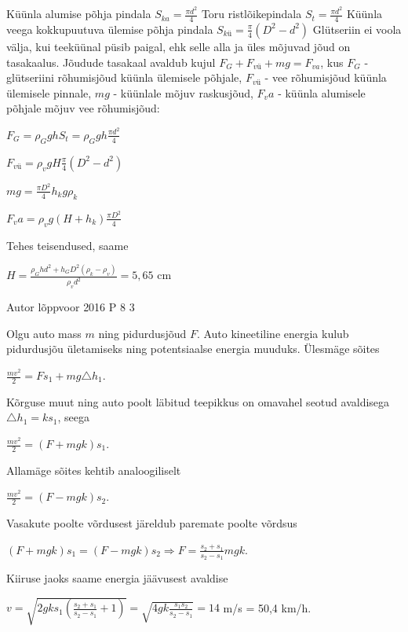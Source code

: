 \documentclass[11pt]{article}
\begin{document}
{{\ifSolution
Küünla alumise põhja pindala $S_{ka} = \frac{\pi d^2}{4}$
\newline
Toru ristlõikepindala $S_t = \frac{\pi d^2}{4}$
\newline
Küünla veega kokkupuutuva ülemise põhja pindala $S_{kü} = \frac{\pi}{4}(D^2 - d^2)$
\newline
Glütseriin ei voola välja, kui teeküünal püsib paigal, ehk selle alla ja üles mõjuvad jõud on tasakaalus. Jõudude tasakaal avaldub kujul $F_G + F_{vü} + mg = F_{va}$,
\newline
kus $F_G$ - glütseriini rõhumisjõud küünla ülemisele põhjale,
\newline
$F_{vü}$ - vee rõhumisjõud küünla ülemisele pinnale,
\newline
$mg$ - küünlale mõjuv raskusjõud,
\newline
$F_va$ - küünla alumisele põhjale mõjuv vee rõhumisjõud:
\begin{center}
$F_G = \rho_G g h S_t = \rho_G g h \frac{\pi d^2}{4}$
\end{center}
\begin{center}
$F_{vü} = \rho_v g H \frac{\pi}{4}(D^2 - d^2)$
\end{center}
\begin{center}
$mg = \frac{\pi D^2}{4}h_k g \rho_k$
\end{center}
\begin{center}
$F_va = \rho_v g (H + h_k)\frac{\pi D^2}{4}$
\end{center}
Tehes teisendused, saame 
\begin{center}
$H = \frac{\rho_{G} h d^2 + h_G D^2 (\rho_k - \rho_v)}{\rho_v d^2} = 5,65$ cm
\end{center}
\fi
}

{Autor} %
{lõppvoor} %
{2016} %
{P 8} %
{3} %
{

\ifSolution
Olgu auto mass $m$ ning pidurdusjõud $F$. Auto kineetiline energia kulub pidurdusjõu ületamiseks ning potentsiaalse energia muuduks. Ülesmäge sõites
\begin{center}
$\frac{mv^2}{2} = Fs_1 + mg\triangle h_1$.
\end{center}
Kõrguse muut ning auto poolt läbitud teepikkus on omavahel seotud avaldisega $\triangle h_1 = ks_1$, seega
\begin{center}
$\frac{mv^2}{2} = (F + mgk)s_1$.
\end{center}
Allamäge sõites kehtib analoogiliselt
\begin{center}
$\frac{mv^2}{2} = (F - mgk) s_2$.
\end{center}
Vasakute poolte võrdusest järeldub paremate poolte võrdsus
\begin{center}
$(F + mgk)s_1 = (F - mgk)s_2 \Rightarrow F = \frac{s_2 + s_1}{s_2 - s_1}mgk$.
\end{center}
Kiiruse jaoks saame energia jäävusest avaldise
\begin{center}
$v = \sqrt{2gks_1 (\frac{s_2 + s_1}{s_2 - s_1} + 1)} = \sqrt{4gk\frac{s_1 s_2}{s_2 - s_1}} = 14$ m/s = 50,4 km/h.
\end{center}
\fi
}

}
\end{document}
